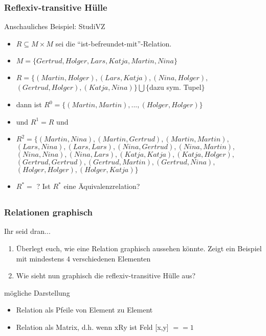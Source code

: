 \begin{frame}
	\frametitle{Reflexiv-transitive Hülle}
	\begin{block}{Anschauliches Beispiel: StudiVZ}
		\begin{itemize}
			\item $R \subseteq M \times M $ sei die "`ist-befreundet-mit"'-Relation.
			\item $M = \{ Gertrud, Holger, Lars, Katja, Martin, Nina \} $ %
			\item $R = \{ (Martin,Holger), (Lars,Katja), (Nina,Holger),$ \\
						$(Gertrud,Holger), (Katja, Nina) \} \bigcup \{${dazu sym. Tupel}$\}$ \pause
			\item dann ist $R^0=\{ (Martin,Martin), ..., (Holger,Holger) \}$
			\item und $R^1=R$ und \pause
			\item $R^2=\{ (Martin,Nina), (Martin,Gertrud), (Martin,Martin),$ \\
						$(Lars,Nina), (Lars,Lars), (Nina,Gertrud),(Nina,Martin),$ \\
						$(Nina,Nina), (Nina,Lars), (Katja,Katja), (Katja,Holger), $ \\
						$(Gertrud,Gertrud), (Gertrud,Martin), (Gertrud,Nina), $ \\
						$(Holger,Holger), (Holger,Katja)\}$
			\item $R^*=$ ? \pause Ist $R^*$ eine Äquivalenzrelation?
		\end{itemize}
	\end{block}
\end{frame}


\subsection*{}
\begin{frame}
	\frametitle{Relationen graphisch}
	\begin{block}{Ihr seid dran...}
		\begin{enumerate}
			\item Überlegt euch, wie eine Relation graphisch aussehen könnte. Zeigt ein Beispiel mit mindestens $4$ verschiedenen Elementen %
			\item Wie sieht nun graphisch die reflexiv-transitive Hülle aus?
		\end{enumerate}
	\end{block} \pause
    \begin{block}{mögliche Darstellung}
    	\begin{itemize}
          \item Relation als Pfeile von Element zu Element
          \item Relation als Matrix, d.h. wenn xRy ist Feld [x,y] $== 1$
        \end{itemize}
    \end{block}
\end{frame}

